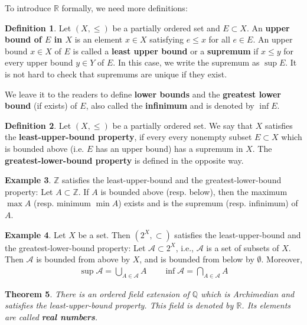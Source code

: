 \documentclass[12pt,b5paper,notitlepage]{article}
\theoremstyle{definition}
\newtheorem{df}{Definition}[section]
\newtheorem{eg}[df]{Example}
\theoremstyle{plain}
\newtheorem{thm}[df]{Theorem}
\newcommand{\scr}{\mathscr}
\newcommand{\Zbb}{\mathbb Z}
\newcommand{\Qbb}{\mathbb Q}
\newcommand{\Rbb}{\mathbb R}
\numberwithin{equation}{section}
\begin{document}
To introduce $\Rbb$ formally, we need more definitions:

\begin{df}
Let $(X,\leq)$ be a partially ordered set and $E\subset X$. An \textbf{upper bound of $E$ in $X$}  is an element $x\in X$ satisfying $e\leq x$ for all $e\in E$. An upper bound $x\in X$ of $E$ is called a \textbf{least upper bound} or a \textbf{supremum}   if $x\leq y$ for every upper bound $y\in Y$ of $E$. In this case, we write the supremum as  $\sup E$. It is not hard to check that supremums are unique if they exist.

We leave it to the readers to define \textbf{lower bounds} and the \textbf{greatest lower bound} (if exists) of $E$, also called the \textbf{infinimum}  and is denoted by  $\inf E$. \hfill\qedsymbol
\end{df}


\begin{df}
Let $(X,\leq)$ be a partially ordered set. We say that $X$ satisfies the \textbf{least-upper-bound property}, if every every nonempty subset $E\subset X$ which is bounded above (i.e. $E$ has an upper bound) has a supremum in $X$. The \textbf{greatest-lower-bound property} is defined in the opposite way.
\end{df}

\begin{eg}
$\Zbb$ satisfies the least-upper-bound and the greatest-lower-bound property: Let $A\subset \Zbb$. If $A$ is bounded above (resp. below), then the maximum $\max A$ (resp. minimum $\min A$) exists and is the supremum (resp. infinimum) of $A$.
\end{eg}

\begin{eg}
Let $X$ be a set. Then $(2^X,\subset)$ satisfies the least-upper-bound and the greatest-lower-bound property: Let $\scr A\subset 2^X$, i.e., $\scr A$ is a set of subsets of $X$. Then $\scr A$ is bounded from above by $X$, and is bounded from below by $\emptyset$. Moreover,
\begin{align*}
\sup\scr A=\bigcup_{A\in\scr A}A\qquad \inf\scr A=\bigcap_{A\in\scr A}A
\end{align*}
\end{eg}



\begin{thm}\label{lb3}
There is an ordered field extension of $\Qbb$ which is Archimedian and satisfies the least-upper-bound property. This field is denoted by  $\Rbb$. Its elements are called  \textbf{real numbers}.
\end{thm}
\end{document}
